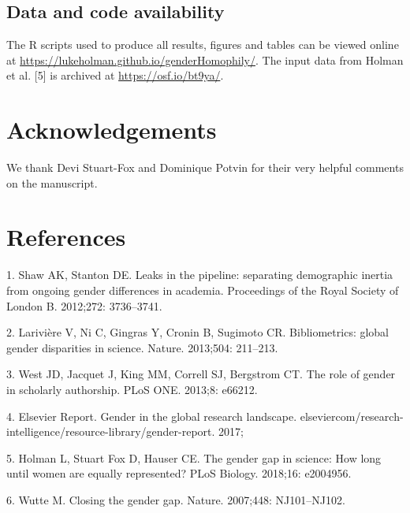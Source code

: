 \documentclass[12pt,]{article}
\begin{document}
\hypertarget{data-and-code-availability}{%
\subsection{Data and code
availability}\label{data-and-code-availability}}

The R scripts used to produce all results, figures and tables can be
viewed online at \url{https://lukeholman.github.io/genderHomophily/}.
The input data from Holman et al. {[}5{]} is archived at
\url{https://osf.io/bt9ya/}.

\hypertarget{acknowledgements}{%
\section{Acknowledgements}\label{acknowledgements}}

We thank Devi Stuart-Fox and Dominique Potvin for their very helpful
comments on the manuscript.

\hypertarget{references}{%
\section{References}\label{references}}

\hypertarget{refs}{}
\leavevmode\hypertarget{ref-Shaw_2012}{}%
1. Shaw AK, Stanton DE. Leaks in the pipeline: separating demographic
inertia from ongoing gender differences in academia. Proceedings of the
Royal Society of London B. 2012;272: 3736--3741.

\leavevmode\hypertarget{ref-Lariviere_2013}{}%
2. Larivière V, Ni C, Gingras Y, Cronin B, Sugimoto CR. Bibliometrics:
global gender disparities in science. Nature. 2013;504: 211--213.

\leavevmode\hypertarget{ref-West_2013}{}%
3. West JD, Jacquet J, King MM, Correll SJ, Bergstrom CT. The role of
gender in scholarly authorship. PLoS ONE. 2013;8: e66212.

\leavevmode\hypertarget{ref-Elsevier_report}{}%
4. Elsevier Report. Gender in the global research landscape.
elseviercom/research-intelligence/resource-library/gender-report. 2017;

\leavevmode\hypertarget{ref-Holman_2018}{}%
5. Holman L, Stuart Fox D, Hauser CE. The gender gap in science: How
long until women are equally represented? PLoS Biology. 2018;16:
e2004956.

\leavevmode\hypertarget{ref-Wutte_2007}{}%
6. Wutte M. Closing the gender gap. Nature. 2007;448: NJ101--NJ102.
\end{document}
